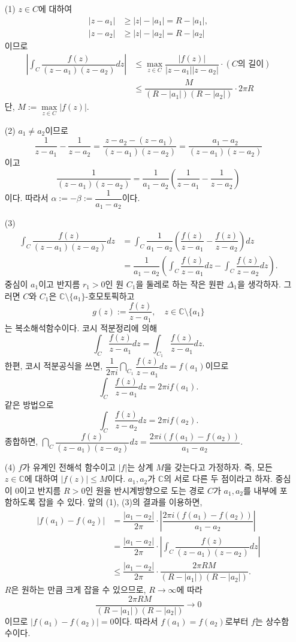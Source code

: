 \begin{itemize}
\item[(1)] $z\in C$에 대하여
\begin{align*}
|z-a_1| &\ge |z| - |a_1| = R - |a_1|, \\
|z-a_2| &\ge |z| - |a_2| = R - |a_2|
\end{align*}
이므로 
\begin{align*}
\left| \int_C \dfrac{f(z)}{(z-a_1)(z-a_2)} dz \right|
&\le \max_{z\in C} \dfrac{|f(z)|}{|z-a_1| |z-a_2|} \cdot
(C\text{의 길이}) \\
&\le \dfrac{M}{(R-|a_1|)(R-|a_2|)}\cdot 2\pi R
\end{align*}
단, $M:= \max\limits_{z\in C}|f(z)|$.

\item[(2)]  $a_1\ne a_2$이므로
\[
\dfrac1{z-a_1} - \dfrac1{z-a_2} = \dfrac{z-a_2 -(z-a_1)}{(z-a_1)(z-a_2)}
= \dfrac{a_1 -a_2}{(z-a_1)(z-a_2)}
\]
이고
\[
\dfrac1{(z-a_1)(z-a_2)} = \dfrac1{a_1 - a_2} \left(
\dfrac1{z-a_1} - \dfrac1{z-a_2} \right)
\]
이다. 따라서 $\alpha:=-\beta:= \dfrac1{a_1-a_2}$이다.

\item[(3)] 
\begin{align*}
\int_C \dfrac{f(z)}{(z-a_1)(z-a_2)} dz
&= \int_C \dfrac1{a_1-a_2}\left(
\dfrac{f(z)}{z-a_1} - \dfrac{f(z)}{z-a_2} \right) dz \\
&= \dfrac1{a_1-a_2} \left( \int_C \dfrac{f(z)}{z-a_1}dz - \int_C \dfrac{f(z)}{z-a_2}dz \right).
\end{align*}
중심이 $a_1$이고 반지름 $r_1>0$인 원 $C_1$을 둘레로 하는 작은 원판 $ \Delta_1$을 생각하자.
그러면 $C$와 $C_1$은 $\mathbb C \setminus \{a_1\}$-호모토픽하고
\[
g(z):= \dfrac{f(z)}{z-a_1}, \quad z\in \mathbb C\setminus \{a_1\}
\]
는 복소해석함수이다. 코시 적분정리에 의해
\[
\int_C \dfrac{f(z)}{z-a_1}dz = \int_{C_1} \dfrac{f(z)}{z-a_1}dz.
\]
한편, 코시 적분공식을 쓰면,
$\dfrac1{2\pi i} \dint_{C_1} \dfrac{f(z)}{z-a_1}dz = f(a_1)$이므로
\[
\int_C \dfrac{f(z)}{z-a_1}dz = 2\pi i f(a_1).
\]
같은 방법으로
\[
\int_C \dfrac{f(z)}{z-a_2}dz = 2\pi i f(a_2).
\]
종합하면, $\dint_C \dfrac{f(z)}{(z-a_1)(z-a_2)} dz
= \dfrac{2\pi i(f(a_1) - f(a_2))}{a_1 - a_2}$.
\item[(4)]
$f$가 유계인 전해석 함수이고 $|f|$는 상계 $M$을 갖는다고 가정하자.
즉, 모든 $z\in\mathbb C$에 대하여 $|f(z)| \le M$이다.
$a_1, a_2$가 $\mathbb C$의 서로 다른  두 점이라고 하자.
중심이 $0$이고 반지름 $R>0$인 원을 반시계방향으로 도는 경로 $C$가
$a_1, a_2$를 내부에 포함하도록 잡을 수 있다.
앞의 (1), (3)의 결과를 이용하면,
\begin{align*}
|f(a_1) - f(a_2)|
&= \dfrac{|a_1 - a_2|}{2\pi} \cdot \left| \dfrac{2\pi i(f(a_1) - f(a_2))}{a_1 - a_2} \right| \\
&= \dfrac{|a_1 - a_2|}{2\pi} \cdot \left| \int_C \dfrac{f(z)}{(z-a_1)(z-a_2)}dz \right| \\
&\le \dfrac{|a_1 - a_2|}{2\pi} \cdot \dfrac{2\pi RM}{(R-|a_1|)(R-|a_2|)}.
\end{align*}
$R$은 원하는 만큼 크게 잡을 수 있으므로, 
$R\to\infty$에 따라
\[
\dfrac{2\pi RM}{(R-|a_1|)(R-|a_2|)} \to 0
\]
이므로 $|f(a_1) - f(a_2)| =0$이다.
따라서 $f(a_1) = f(a_2)$로부터 $f$는 상수함수이다.
\end{itemize}










 